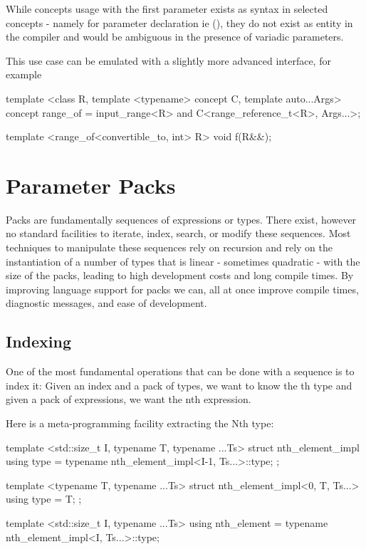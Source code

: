\documentclass{wg21}
\begin{document}
While concepts usage with the first parameter exists as syntax in selected concepts - namely for parameter declaration ie (),
they do not exist as entity in the compiler and would be ambiguous in the presence of variadic parameters.

This use case can be emulated with a slightly more advanced interface, for example

\begin{colorblock}
template <class R, template <typename> concept C, template auto...Args>
concept range_of = input_range<R> and C<range_reference_t<R>, Args...>;

template <range_of<convertible_to, int> R> void f(R&&);
\end{colorblock}


\section{Parameter Packs}

Packs are fundamentally sequences of expressions or types.
There exist, however no standard facilities to iterate, index, search, or modify these sequences.
Most techniques to manipulate these sequences rely on recursion and rely on the instantiation of a number of types that is linear - sometimes quadratic - with the size of the packs, leading to high development costs and long compile times.
By improving language support for packs we can, all at once improve compile times, diagnostic messages, and ease of development.

\subsection{Indexing}

One of the most fundamental operations that can be done with a sequence is to index it:
Given an index  and a pack of types, we want to know the th type and given a pack of expressions, we want the nth expression.

Here is a meta-programming facility extracting the Nth type:

\begin{colorblock}
template <std::size_t I, typename T, typename ...Ts>
struct nth_element_impl {
    using type = typename nth_element_impl<I-1, Ts...>::type;
};

template <typename T, typename ...Ts>
struct nth_element_impl<0, T, Ts...> {
    using type = T;
};

template <std::size_t I, typename ...Ts>
using nth_element = typename nth_element_impl<I, Ts...>::type;
\end{colorblock}
\end{document}
